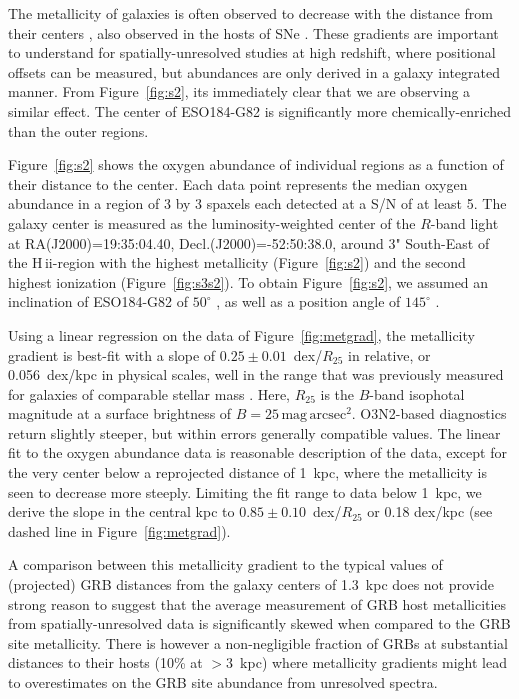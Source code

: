 \documentclass[traditabstract]{aa}
\newcommand{\hii}{\mbox{H\,{\sc ii}}}
\begin{document}
The metallicity of galaxies is often observed to decrease with the distance from their centers \citep[e.g.,][]{1994ApJ...420...87Z, 2014A&A...563A..49S}, also observed in the hosts of SNe \citep{2016A&A...591A..48G}. These gradients are important to understand for spatially-unresolved studies at high redshift, where positional offsets can be measured, but abundances are only derived in a galaxy integrated manner. From Figure~\ref{fig:s2}, its immediately clear that we are observing a similar effect. The center of ESO184-G82 is significantly more chemically-enriched than the outer regions. 

Figure~\ref{fig:s2} shows the oxygen abundance of individual regions as a function of their distance to the center. Each data point represents the median oxygen abundance in a region of 3 by 3 spaxels each detected at a S/N of at least 5. The galaxy center is measured as the luminosity-weighted center of the $R$-band light at RA(J2000)=19:35:04.40, Decl.(J2000)=-52:50:38.0, around 3" South-East of the \hii-region with the highest metallicity (Figure~\ref{fig:s2}) and the second highest ionization (Figure~\ref{fig:s3s2}). To obtain Figure~\ref{fig:s2}, we assumed an inclination of ESO184-G82 of $50^{\circ}$ \citep{2008A&A...490...45C, 2015MNRAS.454L..51A}, as well as a position angle of $145^{\circ}$ \citep{1989spce.book.....L}. 

Using a linear regression on the data of Figure~\ref{fig:metgrad}, the metallicity gradient is best-fit with a slope of $0.25\pm0.01$~dex/$R_{25}$ in relative, or 0.056~dex/kpc in physical scales, well in the range that was previously measured for galaxies of comparable stellar mass \citep{2015MNRAS.448.2030H}. Here, $R_{25}$ is the $B$-band isophotal magnitude at a surface brightness of $B=25\,\mathrm{mag}\,\mathrm{arcsec}^2$. O3N2-based diagnostics return slightly steeper, but within errors generally compatible values. The linear fit to the oxygen abundance data is reasonable description of the data, except for the very center below a reprojected distance of 1~kpc, where the metallicity is seen to decrease more steeply. Limiting the fit range to data below 1~kpc, we derive the slope in the central kpc to $0.85\pm0.10$~dex/$R_{25}$ or 0.18 dex/kpc (see dashed line in Figure~\ref{fig:metgrad}). 

A comparison between this metallicity gradient to the typical values of (projected) GRB distances from the galaxy centers of 1.3~kpc \citep{2016ApJ...817..144B} does not provide strong reason to suggest that the average measurement of GRB host metallicities from spatially-unresolved data is significantly skewed when compared to the GRB site metallicity. There is however a non-negligible fraction of GRBs at substantial distances to their hosts (10\% at $>3$~kpc) where metallicity gradients might lead to overestimates on the GRB site abundance from unresolved spectra.
\end{document}
